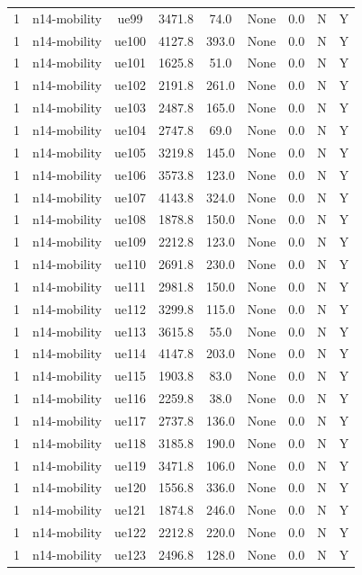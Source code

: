 \begin{table}[ht]
\begin{tabular}{|c|c|c|c|c|c|c|c|c|}
1 & n14-mobility & ue99 & 3471.8 & 74.0 & None & 0.0 & N & Y \\
1 & n14-mobility & ue100 & 4127.8 & 393.0 & None & 0.0 & N & Y \\
1 & n14-mobility & ue101 & 1625.8 & 51.0 & None & 0.0 & N & Y \\
1 & n14-mobility & ue102 & 2191.8 & 261.0 & None & 0.0 & N & Y \\
1 & n14-mobility & ue103 & 2487.8 & 165.0 & None & 0.0 & N & Y \\
1 & n14-mobility & ue104 & 2747.8 & 69.0 & None & 0.0 & N & Y \\
1 & n14-mobility & ue105 & 3219.8 & 145.0 & None & 0.0 & N & Y \\
1 & n14-mobility & ue106 & 3573.8 & 123.0 & None & 0.0 & N & Y \\
1 & n14-mobility & ue107 & 4143.8 & 324.0 & None & 0.0 & N & Y \\
1 & n14-mobility & ue108 & 1878.8 & 150.0 & None & 0.0 & N & Y \\
1 & n14-mobility & ue109 & 2212.8 & 123.0 & None & 0.0 & N & Y \\
1 & n14-mobility & ue110 & 2691.8 & 230.0 & None & 0.0 & N & Y \\
1 & n14-mobility & ue111 & 2981.8 & 150.0 & None & 0.0 & N & Y \\
1 & n14-mobility & ue112 & 3299.8 & 115.0 & None & 0.0 & N & Y \\
1 & n14-mobility & ue113 & 3615.8 & 55.0 & None & 0.0 & N & Y \\
1 & n14-mobility & ue114 & 4147.8 & 203.0 & None & 0.0 & N & Y \\
1 & n14-mobility & ue115 & 1903.8 & 83.0 & None & 0.0 & N & Y \\
1 & n14-mobility & ue116 & 2259.8 & 38.0 & None & 0.0 & N & Y \\
1 & n14-mobility & ue117 & 2737.8 & 136.0 & None & 0.0 & N & Y \\
1 & n14-mobility & ue118 & 3185.8 & 190.0 & None & 0.0 & N & Y \\
1 & n14-mobility & ue119 & 3471.8 & 106.0 & None & 0.0 & N & Y \\
1 & n14-mobility & ue120 & 1556.8 & 336.0 & None & 0.0 & N & Y \\
1 & n14-mobility & ue121 & 1874.8 & 246.0 & None & 0.0 & N & Y \\
1 & n14-mobility & ue122 & 2212.8 & 220.0 & None & 0.0 & N & Y \\
1 & n14-mobility & ue123 & 2496.8 & 128.0 & None & 0.0 & N & Y \\

\end{tabular}
\end{table}
